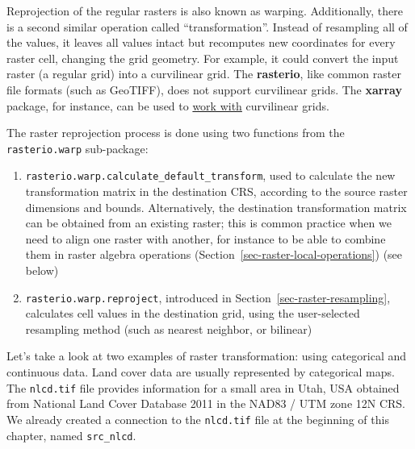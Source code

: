 \documentclass[
  letterpaper,
]{krantz}
\providecommand{\tightlist}{%
  \setlength{\itemsep}{0pt}\setlength{\parskip}{0pt}}\usepackage{longtable,booktabs,array}
\begin{document}
\begin{tcolorbox}[enhanced jigsaw, title=\textcolor{quarto-callout-note-color}{\faInfo}\hspace{0.5em}{Note}, coltitle=black, colbacktitle=quarto-callout-note-color!10!white, breakable, titlerule=0mm, colframe=quarto-callout-note-color-frame, opacitybacktitle=0.6, colback=white, bottomrule=.15mm, left=2mm, leftrule=.75mm, toprule=.15mm, toptitle=1mm, bottomtitle=1mm, arc=.35mm, opacityback=0, rightrule=.15mm]

Reprojection of the regular rasters is also known as warping.
Additionally, there is a second similar operation called
``transformation''. Instead of resampling all of the values, it leaves
all values intact but recomputes new coordinates for every raster cell,
changing the grid geometry. For example, it could convert the input
raster (a regular grid) into a curvilinear grid. The \textbf{rasterio},
like common raster file formats (such as GeoTIFF), does not support
curvilinear grids. The \textbf{xarray} package, for instance, can be
used to
\href{https://docs.xarray.dev/en/stable/examples/multidimensional-coords.html}{work
with} curvilinear grids.

\end{tcolorbox}

The raster reprojection process is done using two functions from the
\texttt{rasterio.warp} sub-package:

\begin{enumerate}
\def\labelenumi{\arabic{enumi}.}
\tightlist
\item
  \texttt{rasterio.warp.calculate\_default\_transform}, used to
  calculate the new transformation matrix in the destination CRS,
  according to the source raster dimensions and bounds. Alternatively,
  the destination transformation matrix can be obtained from an existing
  raster; this is common practice when we need to align one raster with
  another, for instance to be able to combine them in raster algebra
  operations (Section~\ref{sec-raster-local-operations}) (see below)
\item
  \texttt{rasterio.warp.reproject}, introduced in
  Section~\ref{sec-raster-resampling}, calculates cell values in the
  destination grid, using the user-selected resampling method (such as
  nearest neighbor, or bilinear)
\end{enumerate}

Let's take a look at two examples of raster transformation: using
categorical and continuous data. Land cover data are usually represented
by categorical maps. The \texttt{nlcd.tif} file provides information for
a small area in Utah, USA obtained from National Land Cover Database
2011 in the NAD83 / UTM zone 12N CRS. We already created a connection to
the \texttt{nlcd.tif} file at the beginning of this chapter, named
\texttt{src\_nlcd}.
\end{document}
